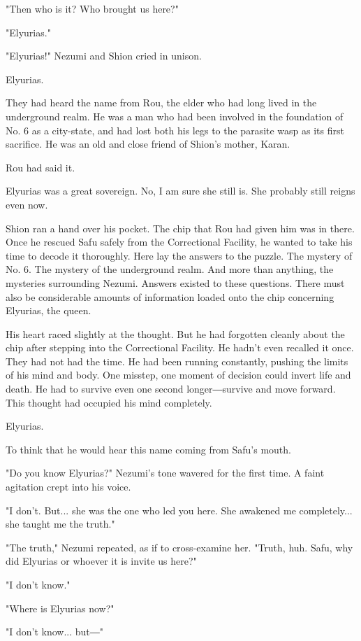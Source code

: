 "Then who is it? Who brought us here?"

"Elyurias."

"Elyurias!" Nezumi and Shion cried in unison.

Elyurias.

They had heard the name from Rou, the elder who had long lived in the
underground realm. He was a man who had been involved in the foundation
of No. 6 as a city-state, and had lost both his legs to the parasite
wasp as its first sacrifice. He was an old and close friend of Shion's
mother, Karan.

Rou had said it.

Elyurias was a great sovereign. No, I am sure she still is. She probably
still reigns even now.

Shion ran a hand over his pocket. The chip that Rou had given him was in
there. Once he rescued Safu safely from the Correctional Facility, he
wanted to take his time to decode it thoroughly. Here lay the answers to
the puzzle. The mystery of No. 6. The mystery of the underground realm.
And more than anything, the mysteries surrounding Nezumi. Answers
existed to these questions. There must also be considerable amounts of
information loaded onto the chip concerning Elyurias, the queen.

His heart raced slightly at the thought. But he had forgotten cleanly
about the chip after stepping into the Correctional Facility. He hadn't
even recalled it once. They had not had the time. He had been running
constantly, pushing the limits of his mind and body. One misstep, one
moment of decision could invert life and death. He had to survive even
one second longer―survive and move forward. This thought had occupied
his mind completely.

Elyurias.

To think that he would hear this name coming from Safu's mouth.

"Do you know Elyurias?" Nezumi's tone wavered for the first time. A
faint agitation crept into his voice.

"I don't. But... she was the one who led you here. She awakened me
completely... she taught me the truth."

"The truth," Nezumi repeated, as if to cross-examine her. "Truth, huh.
Safu, why did Elyurias or whoever it is invite us here?"

"I don't know."

"Where is Elyurias now?"

"I don't know... but―"

